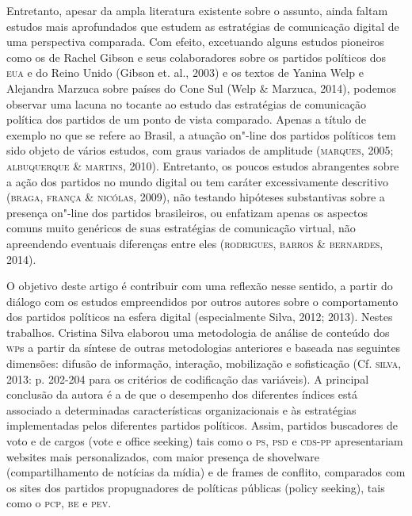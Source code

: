Entretanto, apesar da ampla literatura existente sobre o assunto, ainda
faltam estudos mais aprofundados que estudem as estratégias de
comunicação digital de uma perspectiva comparada. Com efeito, excetuando
alguns estudos pioneiros como os de Rachel Gibson e seus colaboradores
sobre os partidos políticos dos \textsc{eua} e do Reino Unido (Gibson et. al.,
2003) e os textos de Yanina Welp e Alejandra Marzuca sobre países do
Cone Sul (Welp \& Marzuca, 2014), podemos observar uma lacuna no tocante
ao estudo das estratégias de comunicação política dos partidos de um
ponto de vista comparado. Apenas a título de exemplo no que se refere ao
Brasil, a atuação on"-line dos partidos políticos tem sido objeto de
vários estudos, com graus variados de amplitude (\textsc{marques}, 2005;
\textsc{albuquerque} \& \textsc{martins}, 2010). Entretanto, os poucos estudos abrangentes
sobre a ação dos partidos no mundo digital ou tem caráter excessivamente
descritivo (\textsc{braga}, \textsc{frança} \& \textsc{nicólas}, 2009), não testando hipóteses
substantivas sobre a presença on"-line dos partidos brasileiros, ou
enfatizam apenas os aspectos comuns muito genéricos de suas estratégias
de comunicação virtual, não apreendendo eventuais diferenças entre eles
(\textsc{rodrigues}, \textsc{barros} \& \textsc{bernardes}, 2014).

O objetivo deste artigo é contribuir com uma reflexão nesse sentido, a
partir do diálogo com os estudos empreendidos por outros autores sobre o
comportamento dos partidos políticos na esfera digital (especialmente
Silva, 2012; 2013). Nestes trabalhos. Cristina Silva elaborou uma
metodologia de análise de conteúdo dos \textsc{wp}s a partir da síntese de outras
metodologias anteriores e baseada nas seguintes dimensões: difusão de
informação, interação, mobilização e sofisticação (Cf. \textsc{silva}, 2013: p.
202-204 para os critérios de codificação das variáveis). A principal
conclusão da autora é a de que o desempenho dos diferentes índices está
associado a determinadas características organizacionais e às
estratégias implementadas pelos diferentes partidos políticos. Assim,
partidos buscadores de voto e de cargos (vote e office seeking) tais
como o \textsc{ps}, \textsc{psd} e \textsc{cds}-\textsc{pp} apresentariam websites mais personalizados, com
maior presença de shovelware (compartilhamento de notícias da mídia) e
de frames de conflito, comparados com os sites dos partidos
propugnadores de políticas públicas (policy seeking), tais como o \textsc{pcp},
\textsc{be} e \textsc{pev}.

